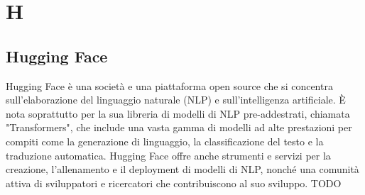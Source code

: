 \section{H}

\vspace{2em}
\subsection*{Hugging Face}
Hugging Face è una società e una piattaforma open source che si concentra sull'elaborazione del linguaggio naturale (NLP) e sull'intelligenza artificiale. È nota soprattutto per la sua libreria di modelli di NLP pre-addestrati, chiamata "Transformers", che include una vasta gamma di modelli ad alte prestazioni per compiti come la generazione di linguaggio, la classificazione del testo e la traduzione automatica. Hugging Face offre anche strumenti e servizi per la creazione, l'allenamento e il deployment di modelli di NLP, nonché una comunità attiva di sviluppatori e ricercatori che contribuiscono al suo sviluppo.
TODO